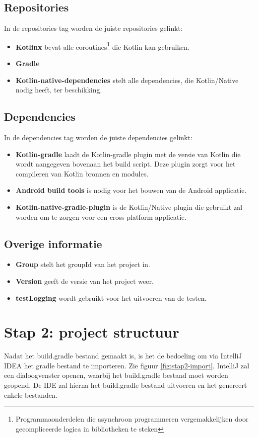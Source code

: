 \subsection{Repositories}
In de repositories tag worden de juiste repositories gelinkt:
\begin{itemize}
	\item \textbf{Kotlinx} bevat alle coroutines\footnote{Programmaonderdelen die asynchroon programmeren vergemakkelijken door gecompliceerde logica in bibliotheken te steken} die Kotlin kan gebruiken.
	\item \textbf{Gradle}
	\item \textbf{Kotlin-native-dependencies} stelt alle dependencies, die Kotlin/Native nodig heeft, ter beschikking.
\end{itemize}

\subsection{Dependencies}
In de dependencies tag worden de juiste dependencies gelinkt:
\begin{itemize}
	\item \textbf{Kotlin-gradle} laadt de Kotlin-gradle plugin met de versie van Kotlin die wordt aangegeven bovenaan het build script. Deze plugin zorgt voor het compileren van Kotlin bronnen en modules.
	\item \textbf{Android build tools} is nodig voor het bouwen van de Android applicatie.
	\item \textbf{Kotlin-native-gradle-plugin} is de Kotlin/Native plugin die gebruikt zal worden om te zorgen voor een cross-platform applicatie.
\end{itemize}

\subsection{Overige informatie}
\label{sec:overige}
\begin{itemize}
	\item \textbf{Group} stelt het groupId van het project in.
	\item \textbf{Version} geeft de versie van het project weer.
	\item \textbf{testLogging} wordt gebruikt voor het uitvoeren van de testen.
\end{itemize}

\section{Stap 2: project structuur}
Nadat het build.gradle bestand gemaakt is, is het de bedoeling om via IntelliJ IDEA het gradle bestand te importeren. Zie figuur \ref{fig:stap2-import}. IntelliJ zal een dialoogvenster openen, waarbij het build.gradle bestand moet worden geopend. De IDE zal hierna het build.gradle bestand uitvoeren en het genereert enkele bestanden.

